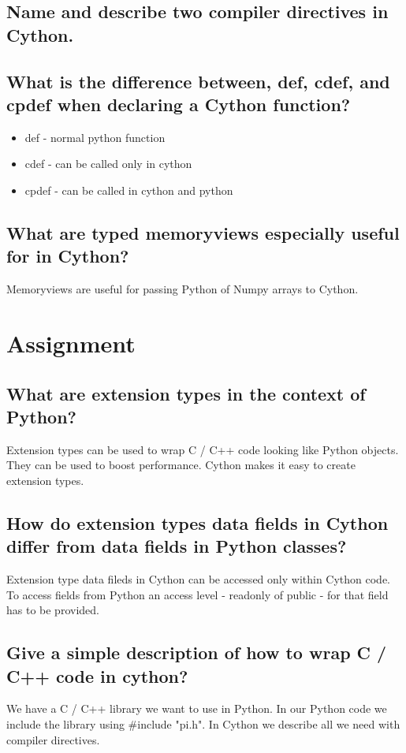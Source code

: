 \documentclass[runningheads]{llncs}
\begin{document}
\subsection{Name and describe two compiler directives in Cython.}

\subsection{What is the difference between, def, cdef, and cpdef when declaring a Cython function?}
\begin{itemize}
	\item def - normal python function
	\item cdef - can be called only in cython
	\item cpdef - can be called in cython and python
\end{itemize}

\subsection{What are typed memoryviews especially useful for in Cython?}
Memoryviews are useful for passing Python of Numpy arrays to Cython.


\section{Assignment}

\subsection{What are extension types in the context of Python?}
Extension types can be used to wrap C / C++ code looking like Python objects.
They can be used to boost performance. Cython makes it easy to create extension types.

\subsection{How do extension types data fields in Cython differ from data fields in Python classes?}
Extension type data fileds in Cython can be accessed only within Cython code.
To access fields from Python an access level - readonly of public - for that field has to be provided.

\subsection{Give a simple description of how to wrap C / C++ code in cython?}
We have a C / C++ library we want to use in Python. 
In our Python code we include the library using \#include "pi.h".
In Cython we describe all we need with compiler directives.
\end{document}

